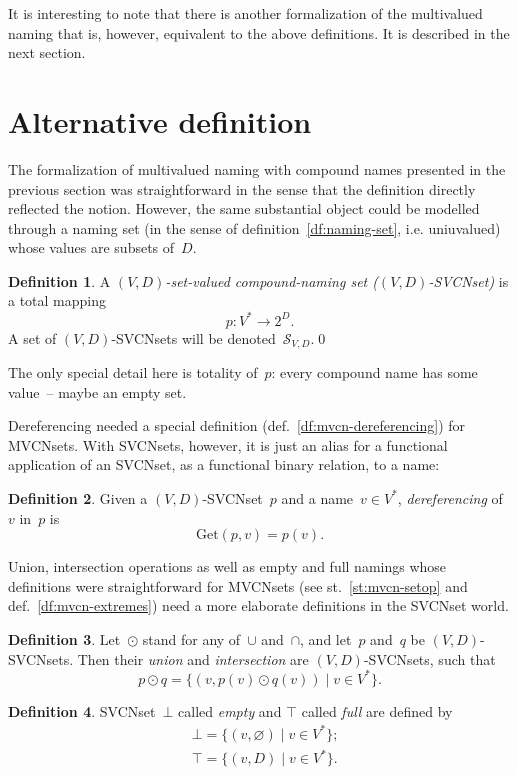 \documentclass{article}
\theoremstyle{definition}
\newtheorem{Df}{Definition}
\newcommand{\setcharsvcn}{S}
\newcommand{\setsymbol}[3]{\mathcal{#1}_{#2,#3}}
\newcommand{\setsvcn}[2]{\setsymbol{\setcharsvcn}{#1}{#2}}
\newcommand{\deref}[2]{\mathrm{Get}(#1, #2)}
\begin{document}
It is interesting to note that there is another formalization of the
multivalued naming that is, however, equivalent to the above definitions.  It
is described in the next section.

\section{Alternative definition}

The formalization of multivalued naming with compound names presented in the
previous section was straightforward in the sense that the definition directly
reflected the notion. However, the same substantial object could be modelled
through a naming set (in the sense of definition~\ref{df:naming-set}, i.e.
uniuvalued) whose values are subsets of~$D$.

\begin{Df}\label{df:svcn}
A \emph{$(V,D)$-set-valued compound-naming set ($(V,D)$-SVCNset)} is a total
mapping
\[
  p : V^\ast \to 2^D .
\]
A set of $(V,D)$-SVCNsets will be denoted~$\setsvcn{V}{D}$.\qed
\end{Df}

The only special detail here is totality of~$p$: every compound name has some
value~-- maybe an empty set.

Dereferencing needed a special definition (def.~\ref{df:mvcn-dereferencing})
for MVCNsets. With SVCNsets, however, it is just an alias for a functional
application of an SVCNset, as a functional binary relation, to a name:
\begin{Df}\label{df:svcn-dereferencing}
Given a $(V,D)$-SVCNset~$p$ and a name~$v\in V^\ast$, \emph{dereferencing}
of~$v$ in~$p$ is
\[
  \deref{p}{v} = p(v).
\]
\end{Df}

Union, intersection operations as well as empty and full namings whose
definitions were straightforward for MVCNsets (see st.~\ref{st:mvcn-setop}
and def.~\ref{df:mvcn-extremes}) need a more elaborate definitions in the
SVCNset world.

\begin{Df}\label{df:union-intersection}
Let~$\odot$ stand for any of~$\cup$ and~$\cap$, and let~$p$ and~$q$ be
$(V,D)$-SVCNsets. Then their \emph{union} and \emph{intersection} are
$(V,D)$-SVCNsets, such that
\[
  p\odot q = \{ (v, p(v) \odot q(v)) \mid v\in V^\ast \} .
\]
\end{Df}

\begin{Df}\label{df:svcn-extremes}
SVCNset~$\bot$ called \emph{empty} and $\top$ called \emph{full} are defined by
\begin{eqnarray*}
  &  \bot = \{ (v, \varnothing) \mid v\in V^\ast \} ; \\
  &  \top = \{ (v, D) \mid v\in V^\ast \} .
\end{eqnarray*}
\end{Df}
\end{document}
